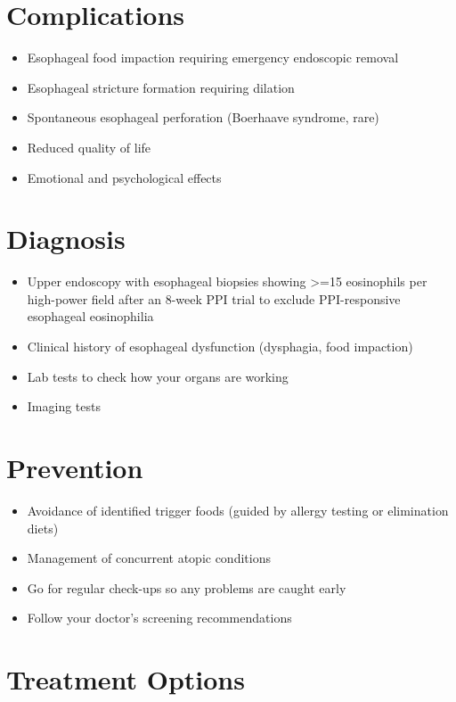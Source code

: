 \section{Complications}

\begin{itemize}[noitemsep]
  \item Esophageal food impaction requiring emergency endoscopic removal
  \item Esophageal stricture formation requiring dilation
  \item Spontaneous esophageal perforation (Boerhaave syndrome, rare)
  \item Reduced quality of life
  \item Emotional and psychological effects
\end{itemize}

\section{Diagnosis}

\begin{itemize}[noitemsep]
  \item Upper endoscopy with esophageal biopsies showing >=15 eosinophils per high-power field after an 8-week PPI trial to exclude PPI-responsive esophageal eosinophilia
  \item Clinical history of esophageal dysfunction (dysphagia, food impaction)
  \item Lab tests to check how your organs are working
  \item Imaging tests
\end{itemize}

\section{Prevention}

\begin{itemize}[noitemsep]
  \item Avoidance of identified trigger foods (guided by allergy testing or elimination diets)
  \item Management of concurrent atopic conditions
  \item Go for regular check-ups so any problems are caught early
  \item Follow your doctor's screening recommendations
\end{itemize}

\section{Treatment Options}

